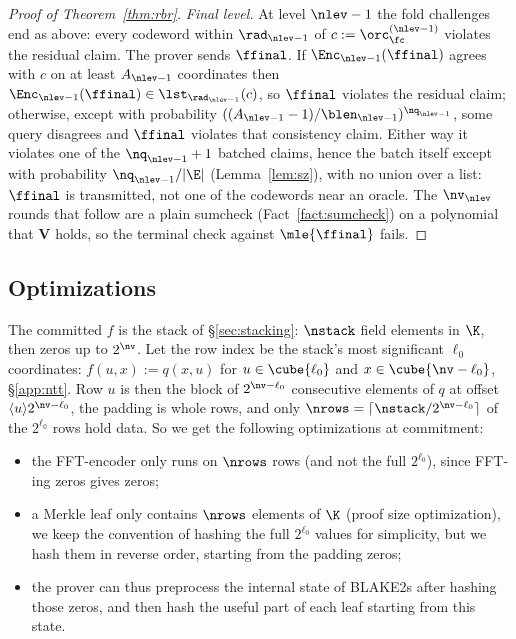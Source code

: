 \begin{proof}[Proof of Theorem~\ref{thm:rbr}]
\medskip\noindent\emph{Final level.}
At level $\nlev - 1$ the fold challenges end as above: every codeword within $\rad_{\nlev-1}$ of $c := \orc^{(\nlev-1)}_\fc$ violates the residual claim. The prover sends $\ffinal$. If $\Enc_{\nlev-1}(\ffinal)$ agrees with $c$ on at least $A_{\nlev-1}$ coordinates then $\Enc_{\nlev-1}(\ffinal) \in \lst_{\rad_{\nlev-1}}(c)$, so $\ffinal$ violates the residual claim; otherwise, except with probability $((A_{\nlev-1}-1)/\blen_{\nlev-1})^{\nq_{\nlev-1}}$, some query disagrees and $\ffinal$ violates that consistency claim. Either way it violates one of the $\nq_{\nlev-1}+1$ batched claims, hence the batch itself except with probability $\nq_{\nlev-1}/|\E|$ (Lemma~\ref{lem:sz}), with no union over a list: $\ffinal$ is transmitted, not one of the codewords near an oracle. The $\nv_\nlev$ rounds that follow are a plain sumcheck (Fact~\ref{fact:sumcheck}) on a polynomial that $\mathbf{V}$ holds, so the terminal check against $\mle{\ffinal}$ fails.

\end{proof}


\subsection{Optimizations}\label{sec:pcs-opt}

The committed $f$ is the stack of \S\ref{sec:stacking}: $\nstack$ field elements in $\K$, then zeros up to $2^{\nv}$. Let the row index be the stack's most significant $\ell_0$ coordinates: $f(u, x) := q(x, u)$ for $u \in \cube{\ell_0}$ and $x \in \cube{\nv - \ell_0}$, \S\ref{app:ntt}. Row $u$ is then the block of $2^{\nv - \ell_0}$ consecutive elements of $q$ at offset $\langle u \rangle 2^{\nv - \ell_0}$, the padding is whole rows, and only $\nrows=\lceil\nstack/2^{\nv-\ell_0}\rceil$ of the $2^{\ell_0}$ rows hold data. So we get the following optimizations at commitment:
\begin{itemize}[itemsep=1pt,topsep=2pt]
\item the FFT-encoder only runs on $\nrows$ rows (and not the full $2^{\ell_0}$), since FFT-ing zeros gives zeros;
\item a Merkle leaf only contains $\nrows$ elements of $\K$ (proof size optimization), we keep the convention of hashing the full $2^{\ell_0}$ values for simplicity, but we hash them in reverse order, starting from the padding zeros;
\item the prover can thus preprocess the internal state of BLAKE2s after hashing those zeros, and then hash the useful part of each leaf starting from this state.
\end{itemize}

